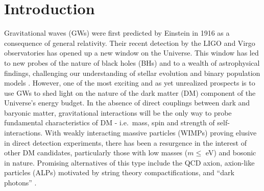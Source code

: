 



\section{Introduction} \label{ag:sect:intro2}



Gravitational waves (GWs) were first predicted by Einstein in 1916 as
a consequence of general relativity.  Their recent detection by the
LIGO and Virgo observatories has opened up a new window on the
Universe. This window has led to new probes of the nature of black holes
(BHs) and to a wealth of astrophysical findings, challenging our
understanding of stellar evolution and binary population models \cite{LIGOScientific:2016aoc,LIGOScientific:2018jsj,LIGOScientific:2020kqk,LIGOScientific:2021psn}.
However, one of the most exciting and as yet unrealized prospects is
to use GWs to shed light on the nature of the dark matter (DM)
component of the Universe's energy budget. In the absence of direct
couplings between dark and baryonic matter, gravitational interactions will be the only way to
probe fundamental characteristics of DM - i.e.~mass, spin and strength
of self-interactions.  With weakly interacting massive particles (WIMPs)
proving elusive in direct detection experiments, there has been a resurgence in the interest of other DM
candidates, particularly those with low masses ($m \leq $ eV) and bosonic in nature.
Promising alternatives of this type include the QCD axion, axion-like particles
(ALPs) motivated by string theory compactifications, and ``dark
photons'' \cite{Arkani-Hamed:2008hhe,Feng:2010gw,Marsh:2015xka,Svrcek:2006yi,Kim:1986ax,Arvanitaki:2009fg,Ringwald:2012cu,Wilczek:1977pj,Peccei:1977hh,Weinberg:1977ma}.

